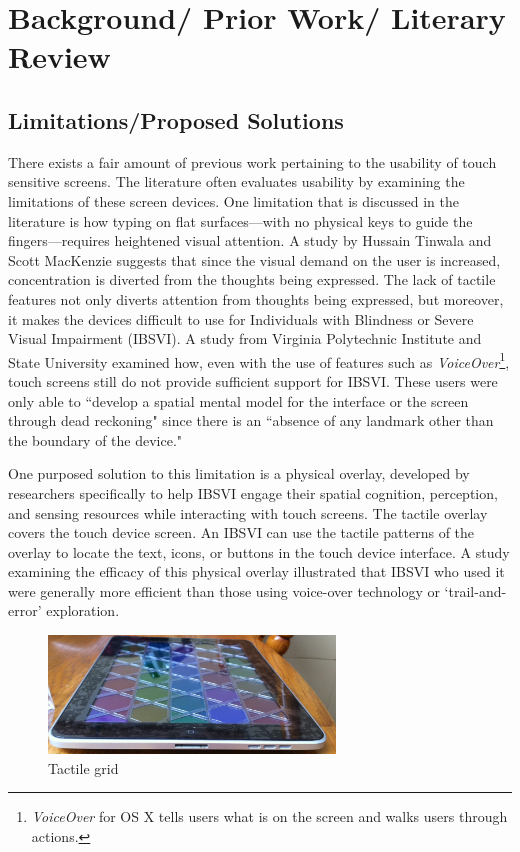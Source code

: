 \documentclass[11pt]{article}
\begin{document}
\section{Background/ Prior Work/ Literary Review}
\subsection{Limitations/Proposed Solutions}
There exists a fair amount of previous work pertaining to the usability of touch sensitive screens. The literature often evaluates usability by examining the limitations of these screen devices. One limitation that is discussed in the literature is how typing on flat surfaces---with no physical keys to guide the fingers---requires heightened visual attention. A study by Hussain Tinwala and Scott MacKenzie suggests that since the visual demand on the user is increased, concentration is diverted from the thoughts being expressed. \cite{Tinwala:2010:ETE:1868914.1868972} The lack of tactile features not only diverts attention from thoughts being expressed, but moreover, it makes the devices difficult to use for Individuals with Blindness or Severe Visual Impairment (IBSVI). A study from Virginia Polytechnic Institute and State University examined how, even with the use of features such as  \textit{VoiceOver}\footnote{\textit{VoiceOver} for OS X tells users what is on the screen and walks users through actions.\cite{VoiceOver}}, touch screens still do not provide sufficient support for IBSVI. These users were only able to ``develop a spatial mental model for the interface or the screen through dead reckoning" since there is an ``absence of any landmark other than the boundary of the device." \cite{El-Glaly:2013:TTF:2460625.2460665} 

One purposed solution to this limitation is a physical overlay, developed by researchers specifically to help IBSVI engage their spatial cognition, perception, and sensing resources while interacting with touch screens.  \cite{El-Glaly:2013:TTF:2460625.2460665} The tactile overlay covers the touch device screen. An IBSVI can use the tactile patterns of the overlay to locate the text, icons, or buttons in the touch device interface. A study examining the efficacy of this physical overlay illustrated that IBSVI who used it were generally more efficient than those using voice-over technology or `trail-and-error' exploration. \cite{El-Glaly:2013:TTF:2460625.2460665}

\begin{figure}[ht]
\centering
\includegraphics[width=3in]{TactileGrid.jpg} 
\caption{Tactile grid}
\label{figure-sample}
\end{figure}
\end{document}
